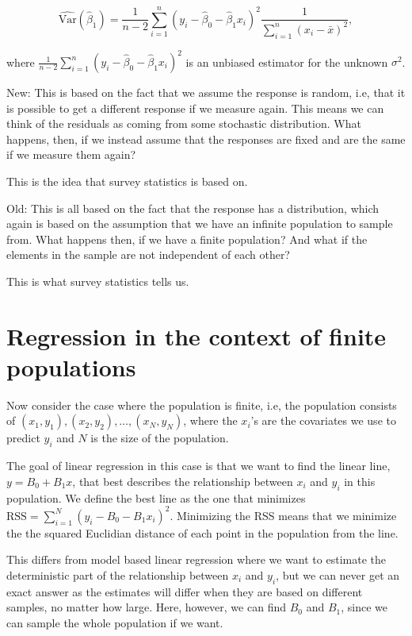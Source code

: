 \documentclass{article}
\begin{document}
\begin{equation*}
 \widehat{\mathrm{Var}} \left( \hat{\beta}_1 \right) = \frac{1}{n - 2} \sum_{i = 1}^n\left( y_i - \hat{\beta}_0 -
 \hat{\beta}_1 x_i \right)^2\frac{1}{
   \sum_{i = 1}^n \left( x_i - \bar{x} \right)^2},
\end{equation*}

where \(\frac{1}{n - 2} \sum_{i = 1}^n\left( y_i - \hat{\beta}_0 -
 \hat{\beta}_1 x_i \right)^2\) is an
unbiased estimator for the unknown \(\sigma^2\).

New: This is based on the fact that we assume the response is random, i.e, that
it is possible to get a different response if we measure again. This means we
can think of the residuals as coming from some stochastic distribution. What
happens, then, if we instead assume that the responses are fixed and are the
same if we measure them again?

This is the idea that survey statistics is based on.

Old: This is all based on the fact that the response has a distribution, which again
is based on the assumption that we have an infinite population to sample from.
What happens then, if we have a finite population? And what if the elements in
the sample are not independent of each other?

This is what survey statistics tells us.



\section{Regression in the context of finite populations}
Now consider the case where the population is finite, i.e, the population
consists of \((x_1, y_1),
(x_2, y_2), \dots , (x_N, y_N)\), where the \(x_i\)'s are the covariates we use to
predict \(y_i\) and \(N\) is the size of the population.

The goal of linear regression in this case is that we want to find the linear
line, \(y = B_0 + B_1x\), that best describes the relationship between \(x_i\)
and \(y_i\) in this population. We define the best line as the one
that minimizes \(\mathrm{RSS} = \sum_{i = 1}^N (y_i - B_0 - B_1 x_i)^2\).
Minimizing the RSS means that we minimize the the squared Euclidian distance of each point
in the population from the line.

This differs from model based linear regression where we want to estimate the
deterministic part of the relationship between \(x_i\) and \(y_i\), but we can
never get an exact answer as the estimates will differ when they are based on
different samples, no matter how large. Here, however, we can find \(B_0\) and
\(B_1\), since we can sample the whole population if we want.
\end{document}

